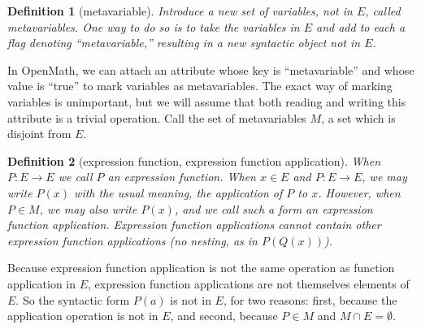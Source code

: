 \documentclass{article}
\newtheorem{dfn}{Definition}
\begin{document}
%
%
%
\begin{dfn}[metavariable]
Introduce a new set of variables, not in $E$, called \emph{metavariables}.  One way to do so is to take the variables in $E$ and add to each a flag denoting ``metavariable,'' resulting in a new syntactic object not in $E$.
\end{dfn}

In OpenMath, we can attach an attribute whose key is ``metavariable'' and whose value is ``true'' to mark variables as metavariables.  The exact way of marking variables is unimportant, but we will assume that both reading and writing this attribute is a trivial operation.  Call the set of metavariables $M$, a set which is disjoint from $E$.

\begin{dfn}[expression function, expression function application]\label{D:efa}
When $P:E\to E$ we call $P$ an \emph{expression function.}  When $x\in E$ and $P:E\to E$, we may write $P(x)$ with the usual meaning, the application of $P$ to $x$.  However, when $P\in M$, we may also write $P(x)$, and we call such a form an \emph{expression function application.}  Expression function applications cannot contain other expression function applications (no nesting, as in $P(Q(x))$).
\end{dfn}

Because expression function application is not the same operation as function application in $E$, expression function applications are not themselves elements of $E$.  So the syntactic form $P(a)$ is not in $E$, for two reasons:  first, because the application operation is not in $E$, and second, because $P\in M$ and $M\cap E=\emptyset$.
\end{document}
